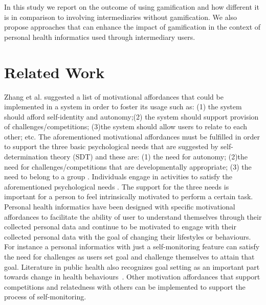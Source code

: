 \documentclass{sig-alternate}
\begin{document}
In this study we report on the outcome of using gamification and how different it is in comparison to involving intermediaries without gamification. We also propose approaches that can enhance the impact of gamification in the context of personal health informatics used through intermediary users.
\section{Related Work} 
Zhang et al.\cite{zhang2008:motivational} suggested a list of motivational affordances that could be implemented in a system in order to foster its usage such as: (1) the system should afford self-identity and autonomy;(2) the system should support provision of challenges/competitions; (3)the system should allow users to relate to each other; etc. The aforementioned motivational affordances must be fulfilled in order to support the three basic psychological needs that are suggested by self-determination theory (SDT) and these are: (1) the need for autonomy; (2)the need for challenges/competitions that are developmentally appropriate;  (3) the need to belong to a group \cite{deci1985:intrinsic}. Individuals engage in activities to satisfy the aforementioned psychological needs \cite{deterding2011:situated}. The support for the three needs is important for a person to feel intrinsically motivated to perform a certain task.\newline     
Personal health informatics have been designed with specific motivational affordances to facilitate the ability of user to understand themselves through their collected personal data and continue to be motivated to engage with their collected personal data with the goal of changing their lifestyles or behaviours. For instance a personal informatics with just a self-monitoring feature can satisfy the need for challenges as users set goal and challenge themselves to attain that goal. Literature in public health also recognizes goal setting as an important part towards change in health behaviours~\cite{strecher1995goal}. Other motivation affordances that support competitions and relatedness with others can be implemented to support the process of self-monitoring. \newline
\end{document}
